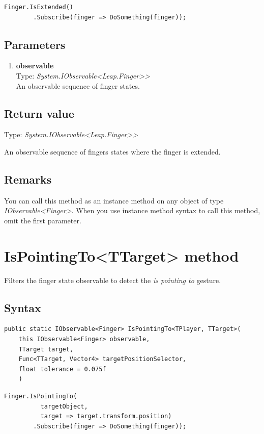 \documentclass[12pt,a4paper,twoside]{report}
\begin{document}
\begin{lstlisting}[caption=Usage example]
  Finger.IsExtended()
        .Subscribe(finger => DoSomething(finger));
\end{lstlisting}

\subsection{Parameters}
\begin{enumerate}
  \item \textbf{observable}\\
    Type: \textit{System.IObservable<Leap.Finger>{}>}\\
    An observable sequence of finger states.
\end{enumerate}

\subsection{Return value}
Type: \textit{System.IObservable<Leap.Finger>{}>}

An observable sequence of fingers states where the finger is extended.

\subsection{Remarks}
You can call this method as an instance method on any object of type \textit{IObservable<Finger>}. When you use instance method syntax to call this method, omit the first parameter.

\newpage

\section{IsPointingTo<TTarget> method}
Filters the finger state observable to detect the \textit{is pointing to} gesture.

\subsection{Syntax}
\begin{lstlisting}[caption=Declaration]
  public static IObservable<Finger> IsPointingTo<TPlayer, TTarget>(
    this IObservable<Finger> observable,
    TTarget target,
    Func<TTarget, Vector4> targetPositionSelector,
    float tolerance = 0.075f
    )  
\end{lstlisting}

\begin{lstlisting}[caption=Usage example]
  Finger.IsPointingTo(
          targetObject,
          target => target.transform.position)
        .Subscribe(finger => DoSomething(finger));
\end{lstlisting}
\end{document}
